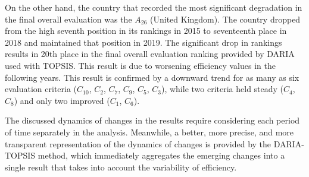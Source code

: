 \documentclass[5p,times]{elsarticle}
\begin{document}
On the other hand, the country that recorded the most significant degradation in the final overall evaluation was the $A_{26}$ (United Kingdom). The country dropped from the high seventh position in its rankings in 2015 to seventeenth place in 2018 and maintained that position in 2019. The significant drop in rankings results in 20th place in the final overall evaluation ranking provided by DARIA used with TOPSIS. This result is due to worsening efficiency values in the following years. This result is confirmed by a downward trend for as many as six evaluation criteria ($C_{10}$, $C_{2}$, $C_{7}$, $C_{9}$, $C_{5}$, $C_{3}$), while two criteria held steady ($C_{4}$, $C_{8}$) and only two improved ($C_{1}$, $C_{6}$). 

The discussed dynamics of changes in the results require considering each period of time separately in the analysis. Meanwhile, a better, more precise, and more transparent representation of the dynamics of changes is provided by the DARIA-TOPSIS method, which immediately aggregates the emerging changes into a single result that takes into account the variability of efficiency.
%
\end{document}
